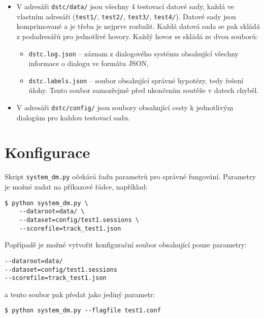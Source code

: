 \begin{itemize}
\item V adresáři \texttt{dstc/data/} jsou všechny 4 testovací datové sady, každá ve vlastním adresáři (\texttt{test1/}, \texttt{test2/}, \texttt{test3/}, \texttt{test4/}).
Datové sady jsou komprimované a je třeba je nejprve rozbalit.
Každá datová sada se pak skládá z podadresářů pro jednotlivé hovory.
Každý hovor se skládá ze dvou souborů:
	\begin{itemize}
	\item \texttt{dstc.log.json} -- záznam z dialogového systému obsahující všechny informace o dialogu ve formátu JSON,
	\item \texttt{dstc.labels.json} -- soubor obsahující správné hypotézy, tedy řešení úlohy. Tento soubor samozřejmě před ukončením soutěže v datech  chyběl.
	\end{itemize}

\item V adresáři \texttt{dstc/config/} jsou soubory obsahující cesty k jednotlivým dialogům pro každou testovací sadu.
\end{itemize}

\section{Konfigurace}

Skript \texttt{system\_dm.py} očekává řadu parametrů pro správné fungování.
Parametry je možné zadat na příkazové řádce, například:
\begin{verbatim}
$ python system_dm.py \
    --dataroot=data/ \
    --dataset=config/test1.sessions \
    --scorefile=track_test1.json
\end{verbatim}

Popřípadě je možné vytvořit konfigurační soubor obsahující pouze parametry:
\begin{verbatim}
--dataroot=data/
--dataset=config/test1.sessions
--scorefile=track_test1.json
\end{verbatim}
a tento soubor pak předat jako jediný parametr:
\begin{verbatim}
$ python system_dm.py --flagfile test1.conf
\end{verbatim}

